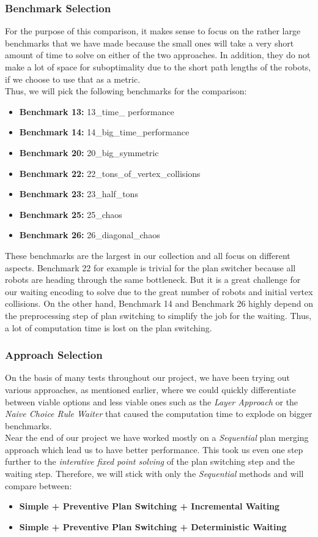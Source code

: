 \documentclass{llncs}
\begin{document}
\subsubsection{Benchmark Selection}
For the purpose of this comparison, it makes sense to focus on the rather large benchmarks that we have made because the small ones will take a very short amount of time to solve on either of the two approaches. In addition, they do not make a lot of space for suboptimality due to the short path lengths of the robots, if we choose to use that as a metric.\\
Thus, we will pick the following benchmarks for the comparison:
\begin{itemize}
    \item \textbf{Benchmark 13:} 13\_time\_ performance
    \item \textbf{Benchmark 14:} 14\_big\_time\_performance
    \item \textbf{Benchmark 20:} 20\_big\_symmetric
    \item \textbf{Benchmark 22:} 22\_tons\_of\_vertex\_collisions
    \item \textbf{Benchmark 23:} 23\_half\_tons
    \item \textbf{Benchmark 25:} 25\_chaos
    \item \textbf{Benchmark 26:} 26\_diagonal\_chaos
\end{itemize}

These benchmarks are the largest in our collection and all focus on different aspects. Benchmark 22 for example is trivial for the plan switcher because all robots are heading through the same bottleneck. But it is a great challenge for our waiting encoding to solve due to the great number of robots and initial vertex collisions. On the other hand, Benchmark 14 and Benchmark 26 highly depend on the preprocessing step of plan switching to simplify the job for the waiting. Thus, a lot of computation time is lost on the plan switching.


\subsubsection{Approach Selection}
On the basis of many tests throughout our project, we have been trying out various approaches, as mentioned earlier, where we could quickly differentiate between viable options and less viable ones such as the \emph{Layer Approach} or the \emph{Naive Choice Rule Waiter} that caused the computation time to explode on bigger benchmarks.\\
Near the end of our project we have worked mostly on a \emph{Sequential} plan merging approach which lead us to have better performance. This took us even one step further to the \emph{interative fixed point solving} of the plan switching step and the waiting step.
Therefore, we will stick with only the \emph{Sequential} methods and will compare between:
\begin{itemize}
    \item \textbf{Simple + Preventive Plan Switching + Incremental Waiting}
    \item \textbf{Simple + Preventive Plan Switching + Deterministic Waiting}
\end{itemize}
\end{document}
